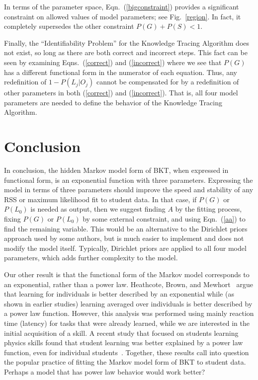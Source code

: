 \documentclass[jedm,acmnow]{acmtrans2m}
\begin{document}
In terms of the parameter space, Eqn.~(\ref{bigconstraint})
provides a significant constraint on allowed values of model
parameters; see Fig.~\ref{region}.  In fact, it completely supersedes the
other constraint $P(G)+P(S)<1$.

Finally, the ``Identifiability Problem'' for the Knowledge Tracing Algorithm
does not exist, so long as there are both correct and incorrect steps.
This fact can be seen by examining Eqns.~(\ref{correct}) and (\ref{incorrect})
where we see that $P(G)$ has a different functional form in
the numerator of each equation.  Thus, any redefinition of $1-P(L_j|O_j)$ 
cannot be compensated for by a redefinition
of other parameters in both  (\ref{correct}) and (\ref{incorrect}).
That is, all four model parameters are needed to define the behavior
of the Knowledge Tracing Algorithm.


\section{Conclusion}


In conclusion, the hidden Markov model form of BKT, when expressed
in functional form, is an exponential function with three parameters.
Expressing the model in terms of three parameters should 
improve the speed and stability of any RSS or maximum likelihood 
fit to student data.  In that case, if $P(G)$ or
$P(L_0)$ is needed as output, then we suggest finding $A$ by
the fitting process,  fixing $P(G)$ or $P(L_0)$ by some 
external constraint, and using Eqn.~(\ref{aa}) to find the remaining
variable.
This would be an alternative to the Dirichlet 
priors~\cite{beck_identifiability:_2007} approach used by
some authors, but is much easier to implement and does not
modify the model itself.  Typically, Dirichlet priors are applied
to all four model parameters, which adds further complexity to the
model. 

Our other result is that the functional form of the Markov model 
corresponds to an exponential, rather than a power law.  
Heathcote, Brown, and Mewhort~\citeyear{heathcote_power_2000}
argue that learning for individuals is better described by an
exponential while (as shown in earlier studies) learning averaged
over individuals is better described by a power law function.
However, this analysis was performed using mainly reaction time
(latency) for tasks that were already learned, while we are interested
in the initial acquisition of a skill.  A recent study that focused
on students learning physics skills found that student learning
was better explained by a power law function, even for individual 
students~\cite{chi_instructional_2011}.
Together, these results call into question the popular practice of 
fitting the Markov model form of BKT to student data. 
Perhaps a model that has power law behavior would work better?
\end{document}

